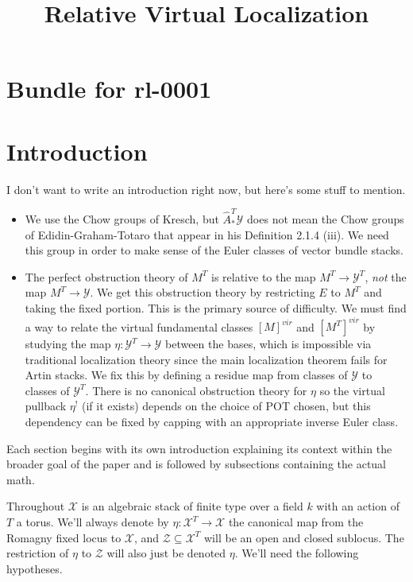 \documentclass[12pt,dvipsnames]{amsart}
\title{Relative Virtual Localization}
\begin{document}
\section*{Bundle for rl-0001}

\section{Introduction}\label{rl-0001}

I don't want to write an introduction right now, but here's some stuff to mention.
\begin{itemize}
  \item We use the Chow groups of Kresch, but \(\hat A_*^T\mathcal Y\) does not mean the Chow groups of Edidin-Graham-Totaro that appear in his Definition 2.1.4 (iii). We need this group in order to make sense of the Euler classes of vector bundle stacks.
  \item The perfect obstruction theory of \(M^T\) is relative to the map \(M^T\to \mathcal Y^T\), \textit{not} the map \(M^T\to \mathcal Y\). We get this obstruction theory by restricting \(E\) to \(M^T\) and taking the fixed portion. This is the primary source of difficulty. We must find a way to relate the virtual fundamental classes \([M]^{vir}\) and \([M^T]^{vir}\) by studying the map \(\eta:\mathcal Y^T\to \mathcal Y\) between the bases, which is impossible via traditional localization theory since the main localization theorem fails for Artin stacks. We fix this by defining a residue map from classes of \(\mathcal Y\) to classes of \(\mathcal Y^T\). There is no canonical obstruction theory for \(\eta\) so the virtual pullback \(\eta^!\) (if it exists) depends on the choice of POT chosen, but this dependency can be fixed by capping with an appropriate inverse Euler class.
\end{itemize}

Each section begins with its own introduction explaining its context within the broader goal of the paper and is followed by subsections containing the actual math.

\bigskip

Throughout \(\mathcal X\) is an algebraic stack of finite type over a field \(k\) with an action of \(T\) a torus. We'll always denote by \(\eta:\mathcal X^T\to \mathcal X\) the canonical map from the Romagny fixed locus to \(\mathcal X\), and \(\mathcal Z\subseteq \mathcal X^T\) will be an open and closed sublocus. The restriction of \(\eta\) to \(\mathcal Z\) will also just be denoted \(\eta\). We'll need the following hypotheses.
\end{document}
